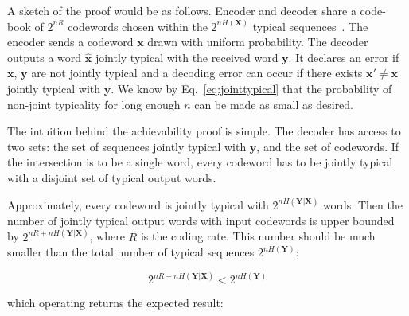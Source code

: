 A sketch of the proof would be as follows. Encoder and decoder share a code-book of $2^{nR}$ codewords chosen within the $2^{nH(\mathbf X)}$ typical sequences~\cite{Massey_77}. The encoder sends a codeword $\mathbf{x}$ drawn with uniform probability. The decoder outputs a word $\hat{\mathbf{x}}$ jointly typical with the received word $\mathbf{y}$. It declares an error if $\mathbf{x}$, $\mathbf{y}$ are not jointly typical and a decoding error can occur if there exists $\mathbf{x}'\neq \mathbf{x}$ jointly typical with $\mathbf{y}$. We know by Eq.~\ref{eq:jointtypical} that the probability of non-joint typicality for long enough $n$ can be made as small as desired. %


The intuition behind the achievability proof is simple. The decoder has access to two sets: the set of sequences jointly typical with $\mathbf{y}$, and the set of codewords. If the intersection is to be a single word, every codeword has to be jointly typical with a disjoint set of typical output words. 

Approximately, every codeword is jointly typical with $2^{nH(\mathbf Y|\mathbf X)}$ words. Then the number of jointly typical output words with input codewords is upper bounded by $2^{nR+nH(\mathbf Y|\mathbf X)}$, where $R$ is the coding rate. This number should be much smaller than the total number of typical sequences $2^{nH(\mathbf Y)}$:
 
\begin{equation*}
2^{nR+nH(\mathbf Y|\mathbf X)} < 2^{nH(\mathbf Y)}
\end{equation*}

\noindent which operating returns the expected result:

